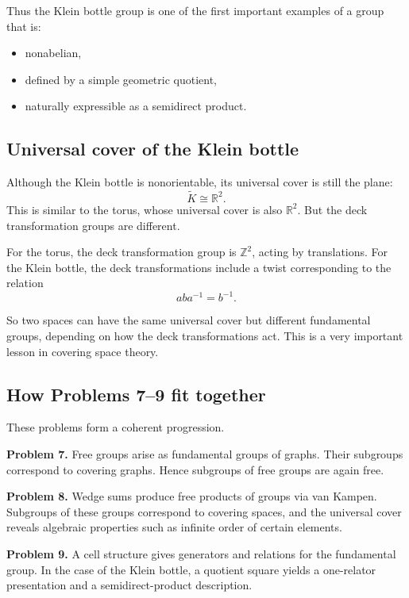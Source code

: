 \documentclass[12pt,a4paper]{article}
\theoremstyle{notespace}
\begin{document}
Thus the Klein bottle group is one of the first important examples of a group that is:
\begin{itemize}
	\item nonabelian,
	\item defined by a simple geometric quotient,
	\item naturally expressible as a semidirect product.
\end{itemize}

\subsection{Universal cover of the Klein bottle}

Although the Klein bottle is nonorientable, its universal cover is still the plane:
\[
\widetilde K\cong \mathbb R^2.
\]
This is similar to the torus, whose universal cover is also \(\mathbb R^2\). But the deck transformation groups are different.

For the torus, the deck transformation group is \(\mathbb Z^2\), acting by translations.  
For the Klein bottle, the deck transformations include a twist corresponding to the relation
\[
aba^{-1}=b^{-1}.
\]

So two spaces can have the same universal cover but different fundamental groups, depending on how the deck transformations act. This is a very important lesson in covering space theory.

\subsection{How Problems 7--9 fit together}

These problems form a coherent progression.

\medskip

\textbf{Problem 7.}
Free groups arise as fundamental groups of graphs. Their subgroups correspond to covering graphs. Hence subgroups of free groups are again free.

\medskip

\textbf{Problem 8.}
Wedge sums produce free products of groups via van Kampen. Subgroups of these groups correspond to covering spaces, and the universal cover reveals algebraic properties such as infinite order of certain elements.

\medskip

\textbf{Problem 9.}
A cell structure gives generators and relations for the fundamental group. In the case of the Klein bottle, a quotient square yields a one-relator presentation and a semidirect-product description.
\end{document}
